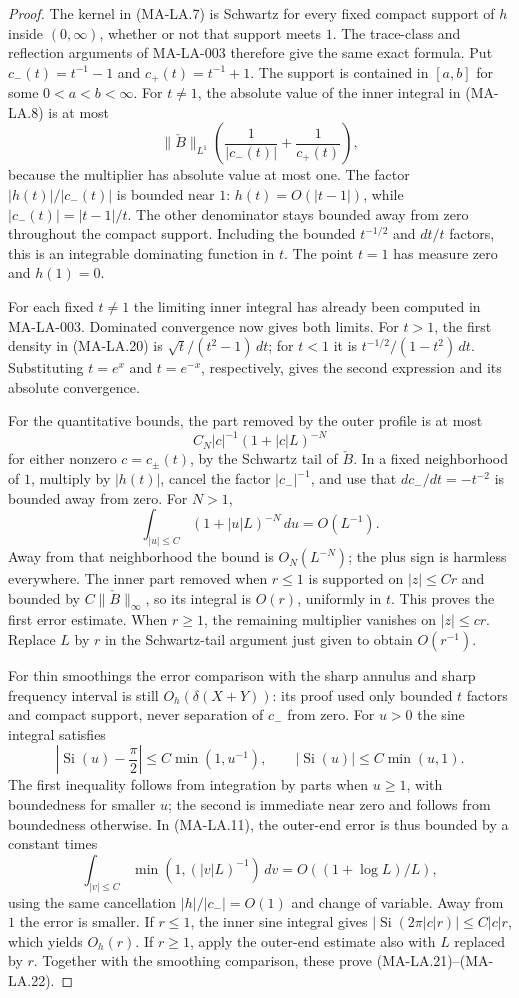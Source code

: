 \begin{proof}
The kernel in (MA-LA.7) is Schwartz for every fixed compact
support of $h$ inside $(0,\infty)$, whether or not that support
meets $1$. The trace-class and reflection arguments of
MA-LA-003 therefore give the same exact formula. Put
$c_-(t)=t^{-1}-1$ and $c_+(t)=t^{-1}+1$. The support is
contained in $[a,b]$ for some $0<a<b<\infty$.
For $t\ne1$, the absolute value of the inner integral
in (MA-LA.8) is at most
\[
 \|\check B\|_{L^1}
      \left(\frac1{|c_-(t)|}+\frac1{c_+(t)}\right),
\]
because the multiplier has absolute value at most one.
The factor $|h(t)|/|c_-(t)|$ is bounded near $1$:
$h(t)=O(|t-1|)$, while
$|c_-(t)|=|t-1|/t$. The other denominator stays bounded
away from zero throughout the compact support. Including
the bounded $t^{-1/2}$ and $dt/t$ factors, this is an
integrable dominating function in $t$. The point $t=1$
has measure zero and $h(1)=0$.

For each fixed $t\ne1$ the limiting inner integral has already
been computed in MA-LA-003. Dominated convergence now gives
both limits. For $t>1$, the first density in (MA-LA.20) is
$\sqrt t/(t^2-1)\,dt$; for $t<1$ it is
$t^{-1/2}/(1-t^2)\,dt$. Substituting $t=e^x$ and
$t=e^{-x}$, respectively, gives the second expression and
its absolute convergence.

For the quantitative bounds, the part removed by the outer
profile is at most
\[
 C_N|c|^{-1}(1+|c|L)^{-N}
\]
for either nonzero $c=c_\pm(t)$, by the Schwartz tail of
$\check B$. In a fixed neighborhood of $1$, multiply by
$|h(t)|$, cancel the factor $|c_-|^{-1}$, and use that
$dc_-/dt=-t^{-2}$ is bounded away from zero. For $N>1$,
\[
 \int_{|u|\le C}(1+|u|L)^{-N}\,du=O(L^{-1}).
\]
Away from that neighborhood the bound is $O_N(L^{-N})$;
the plus sign is harmless everywhere. The inner part removed
when $r\le1$ is supported on $|z|\le Cr$ and bounded by
$C\|\check B\|_\infty$, so its integral is $O(r)$,
uniformly in $t$. This proves the first error estimate.
When $r\ge1$, the remaining multiplier vanishes on
$|z|\le cr$. Replace $L$ by $r$ in the Schwartz-tail
argument just given to obtain $O(r^{-1})$.

For thin smoothings the error comparison with the sharp
annulus and sharp frequency interval is still
$O_h(\delta(X+Y))$: its proof used only bounded $t$ factors
and compact support, never separation of $c_-$ from zero.
For $u>0$ the sine integral satisfies
\[
 \left|\operatorname{Si}(u)-\frac\pi2\right|
       \le C\min(1,u^{-1}),\qquad
 |\operatorname{Si}(u)|\le C\min(u,1).
\]
The first inequality follows from integration by parts when
$u\ge1$, with boundedness for smaller $u$; the second is
immediate near zero and follows from boundedness otherwise.
In (MA-LA.11), the outer-end error is thus bounded by a
constant times
\[
 \int_{|v|\le C}\min(1,(|v|L)^{-1})\,dv
       =O((1+\log L)/L),
\]
using the same cancellation $|h|/|c_-|=O(1)$ and change
of variable. Away from $1$ the error is smaller. If $r\le1$,
the inner sine integral gives $|\operatorname{Si}(2\pi|c|r)|
\le C|c|r$, which yields $O_h(r)$. If $r\ge1$, apply
the outer-end estimate also with $L$ replaced by $r$.
Together with the smoothing comparison, these prove
(MA-LA.21)--(MA-LA.22).
\end{proof}

